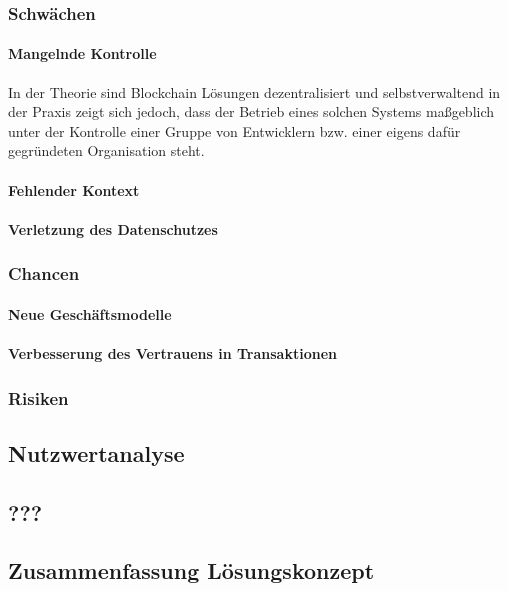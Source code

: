 \subsubsection{Schwächen}
\paragraph{Mangelnde Kontrolle}
In der Theorie sind Blockchain Lösungen dezentralisiert und selbstverwaltend in der Praxis zeigt sich jedoch, dass der Betrieb eines solchen Systems maßgeblich unter der Kontrolle einer Gruppe von Entwicklern bzw. einer eigens dafür gegründeten Organisation steht.

\paragraph{Fehlender Kontext}


\paragraph{Verletzung des Datenschutzes}

\subsubsection{Chancen}
\paragraph{Neue Geschäftsmodelle}

\paragraph{Verbesserung des Vertrauens in Transaktionen}

\subsubsection{Risiken}

\subsection{Nutzwertanalyse}

\subsection{???}

\subsection{Zusammenfassung Lösungskonzept}

\newpage
